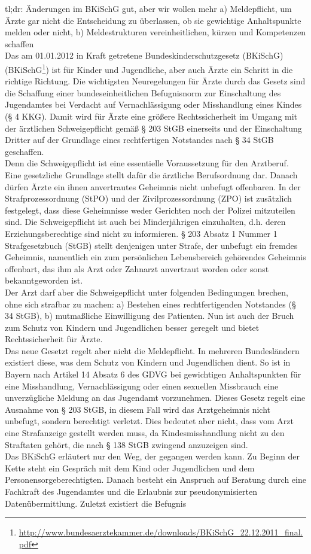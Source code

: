 tl;dr: Änderungen im BKiSchG gut, aber wir wollen mehr a) Meldepflicht, um Ärzte gar nicht die Entscheidung zu überlassen, ob sie gewichtige Anhaltspunkte melden oder nicht, b) Meldestrukturen vereinheitlichen, kürzen und Kompetenzen schaffen\\Das am 01.01.2012 in Kraft getretene Bundeskinderschutzgesetz (BKiSchG) (BKiSchG\footnote{\url{http://www.bundesaerztekammer.de/downloads/BKiSchG\_22.12.2011\_final.pdf}}) ist für Kinder und Jugendliche, aber auch Ärzte ein Schritt in die richtige Richtung. Die wichtigsten Neuregelungen für Ärzte durch das Gesetz sind die Schaffung einer bundeseinheitlichen Befugnisnorm zur Einschaltung des Jugendamtes bei Verdacht auf Vernachlässigung oder Misshandlung eines Kindes (§ 4 KKG). Damit wird für Ärzte eine größere Rechtssicherheit im Umgang mit der ärztlichen Schweigepflicht gemäß § 203 StGB einerseits und der Einschaltung Dritter auf der Grundlage eines rechtfertigen Notstandes nach § 34 StGB geschaffen.\\Denn die Schweigepflicht ist eine essentielle Voraussetzung für den Arztberuf. Eine gesetzliche Grundlage stellt dafür die ärztliche Berufsordnung dar. Danach dürfen Ärzte ein ihnen anvertrautes Geheimnis nicht unbefugt offenbaren. In der Strafprozessordnung (StPO) und der Zivilprozessordnung (ZPO) ist zusätzlich festgelegt, dass diese Geheimnisse weder Gerichten noch der Polizei mitzuteilen sind. Die Schweigepflicht ist auch bei Minderjährigen einzuhalten, d.h. deren Erziehungsberechtige sind nicht zu informieren. § 203 Absatz 1 Nummer 1 Strafgesetzbuch (StGB) stellt denjenigen unter Strafe, der unbefugt ein fremdes Geheimnis, namentlich ein zum persönlichen Lebensbereich gehörendes Geheimnis offenbart, das ihm als Arzt oder Zahnarzt anvertraut worden oder sonst bekanntgeworden ist.\\Der Arzt darf aber die Schweigepflicht unter folgenden Bedingungen brechen, ohne sich strafbar zu machen: a) Bestehen eines rechtfertigenden Notstandes (§ 34 StGB), b) mutmaßliche Einwilligung des Patienten. Nun ist auch der Bruch zum Schutz von Kindern und Jugendlichen besser geregelt und bietet Rechtssicherheit für Ärzte.\\Das neue Gesetzt regelt aber nicht die Meldepflicht. In mehreren Bundesländern existiert diese, was dem Schutz von Kindern und Jugendlichen dient. So ist in Bayern nach Artikel 14 Absatz 6 des GDVG bei gewichtigen Anhaltspunkten für eine Misshandlung, Vernachlässigung oder einen sexuellen Missbrauch eine unverzügliche Meldung an das Jugendamt vorzunehmen. Dieses Gesetz regelt eine Ausnahme von § 203 StGB, in diesem Fall wird das Arztgeheimnis nicht unbefugt, sondern berechtigt verletzt. Dies bedeutet aber nicht, dass vom Arzt eine Strafanzeige gestellt werden muss, da Kindesmisshandlung nicht zu den Straftaten gehört, die nach § 138 StGB zwingend anzuzeigen sind.\\Das BKiSchG erläutert nur den Weg, der gegangen werden kann. Zu Beginn der Kette steht ein Gespräch mit dem Kind oder Jugendlichen und dem Personensorgeberechtigten. Danach besteht ein Anspruch auf Beratung durch eine Fachkraft des Jugendamtes und die Erlaubnis zur pseudonymisierten Datenübermittlung. Zuletzt existiert die Befugnis 